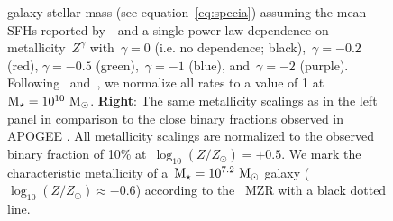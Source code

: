 \documentclass[ms.tex]{subfiles}
\begin{document}
\begin{figure}
{galaxy stellar mass (see equation~\ref{eq:specia}) assuming the mean SFHs
reported by~\um~and a single power-law dependence on metallicity~$Z^\gamma$
with~$\gamma = 0$ (i.e. no dependence; black),~$\gamma = -0.2$ (red),
$\gamma = -0.5$ (green),~$\gamma = -1$ (blue), and~$\gamma = -2$ (purple).
Following~\citet{Brown2019} and~\citet{Gandhi2022}, we normalize all rates to
a value of 1 at~$\text{M}_\star = 10^{10}~\text{M}_\odot$.
\textbf{Right}: The same metallicity scalings as in the left panel in
comparison to the close binary fractions observed in APOGEE
\citep[][black dashed line with error bars]{Moe2019}.
All metallicity scalings are normalized to the observed binary fraction of 10\%
at~$\log_{10}(Z / Z_\odot) = +0.5$.
We mark the characteristic metallicity of a~$\text{M}_\star = 10^{7.2}~\text{M}_\odot$ galaxy
($\log_{10}(Z / Z_\odot) \approx -0.6$) according to the~\citet{Zahid2014} MZR
with a black dotted line.
}
\label{fig:specia_metdep}
\end{figure}
\end{document}
